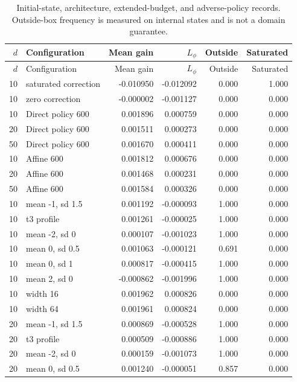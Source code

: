 {\small\setlength{\tabcolsep}{4pt}
\begin{longtable}{rlrrrr}
\caption{Initial-state, architecture, extended-budget, and adverse-policy records. Outside-box frequency is measured on internal states and is not a domain guarantee.}\label{tab:r11allstress}\\
\toprule
$d$ & Configuration & Mean gain & $L_\phi$ & Outside & Saturated\\\midrule\endfirsthead
$d$ & Configuration & Mean gain & $L_\phi$ & Outside & Saturated\\\midrule\endhead
10 & saturated correction & -0.010950 & -0.012092 & 0.000 & 1.000 \\
10 & zero correction & -0.000002 & -0.001127 & 0.000 & 0.000 \\
10 & Direct policy 600 & 0.001896 & 0.000759 & 0.000 & 0.000 \\
20 & Direct policy 600 & 0.001511 & 0.000273 & 0.000 & 0.000 \\
50 & Direct policy 600 & 0.001670 & 0.000411 & 0.000 & 0.000 \\
10 & Affine 600 & 0.001812 & 0.000676 & 0.000 & 0.000 \\
20 & Affine 600 & 0.001468 & 0.000231 & 0.000 & 0.000 \\
50 & Affine 600 & 0.001584 & 0.000326 & 0.000 & 0.000 \\
10 & mean -1, sd 1.5 & 0.001192 & -0.000093 & 1.000 & 0.000 \\
10 & t3 profile & 0.001261 & -0.000025 & 1.000 & 0.000 \\
10 & mean -2, sd 0 & 0.000107 & -0.001023 & 1.000 & 0.000 \\
10 & mean 0, sd 0.5 & 0.001063 & -0.000121 & 0.691 & 0.000 \\
10 & mean 0, sd 1 & 0.000817 & -0.000415 & 1.000 & 0.000 \\
10 & mean 2, sd 0 & -0.000862 & -0.001996 & 1.000 & 0.000 \\
10 & width 16 & 0.001962 & 0.000826 & 0.000 & 0.000 \\
10 & width 64 & 0.001961 & 0.000824 & 0.000 & 0.000 \\
20 & mean -1, sd 1.5 & 0.000869 & -0.000528 & 1.000 & 0.000 \\
20 & t3 profile & 0.000509 & -0.000886 & 1.000 & 0.000 \\
20 & mean -2, sd 0 & 0.000159 & -0.001073 & 1.000 & 0.000 \\
20 & mean 0, sd 0.5 & 0.001240 & -0.000051 & 0.857 & 0.000 \\

\end{longtable}}
